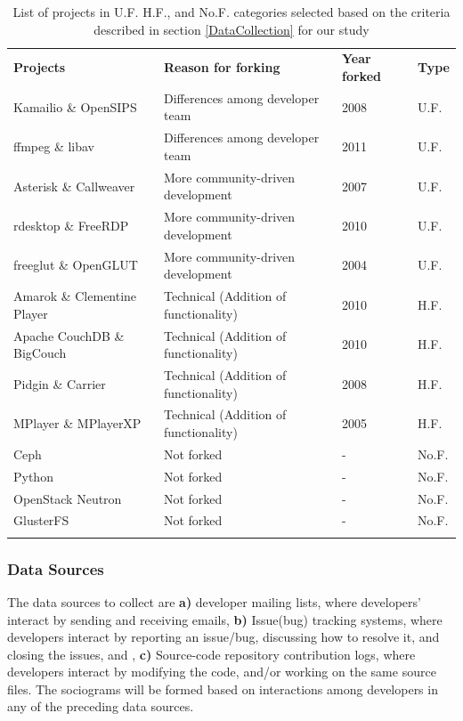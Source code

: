 \documentclass[11pt]{report}
\begin{document}
\begin{table}
\centering
\caption{List of projects in U.F. H.F., and No.F. categories selected based on the criteria described in section \ref{DataCollection} for our study}
\label{forkedProjectsDataCollected}
\begin{tabular}{p{} p{} p{} p{}}
\hline\noalign{\smallskip}
\textbf{Projects} & \textbf{Reason for forking} & \textbf{Year forked} & \textbf{Type}\\
\noalign{\smallskip}\hline\noalign{\smallskip}
Kamailio \& OpenSIPS & Differences among developer team & 2008 & U.F.\\ \hline
ffmpeg \& libav & Differences among developer team & 2011 & U.F.\\ \hline
Asterisk \& Callweaver & More community-driven development & 2007 & U.F.\\ \hline
rdesktop \& FreeRDP  & More community-driven development & 2010 & U.F.\\ \hline
freeglut \& OpenGLUT & More community-driven development & 2004 & U.F.\\ \hline
Amarok \& Clementine Player & Technical (Addition of functionality) & 2010 & H.F.\\ \hline
Apache CouchDB \& BigCouch & Technical (Addition of functionality) & 2010 & H.F.\\ \hline
Pidgin \& Carrier & Technical (Addition of functionality) & 2008 & H.F.\\ \hline
MPlayer \& MPlayerXP & Technical (Addition of functionality) & 2005 & H.F.\\ \hline
Ceph  & Not forked & - & No.F.\\ \hline
Python & Not forked & - & No.F.\\ \hline
OpenStack Neutron & Not forked & - & No.F.\\ \hline
GlusterFS & Not forked & - & No.F.\\ 
\noalign{\smallskip}\hline
\end{tabular}
\end{table}

\subsubsection{Data Sources}
The data sources to collect are \textbf{a)} developer mailing lists, where developers' interact by sending and receiving emails, \textbf{b)} Issue(bug) tracking systems, where developers interact by reporting an issue/bug, discussing how to resolve it, and closing the issues, and , \textbf{c)} Source-code repository contribution logs, where developers interact by modifying the code, and/or working on the same source files. The sociograms will be formed based on interactions among developers in any of the preceding data sources. 
\end{document}
